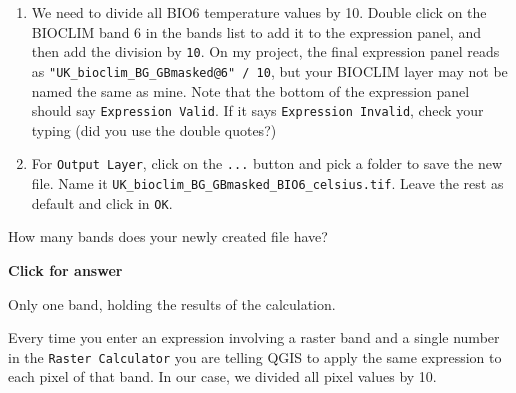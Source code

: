 \documentclass[
  letterpaper,
  DIV=11,
  numbers=noendperiod]{scrreprt}
\begin{document}
\begin{enumerate}
\def\labelenumi{(\arabic{enumi})}
\setcounter{enumi}{171}
\item
  We need to divide all BIO6 temperature values by 10. Double click on
  the BIOCLIM band 6 in the bands list to add it to the expression
  panel, and then add the division by \texttt{10}. On my project, the
  final expression panel reads as
  \texttt{"UK\_bioclim\_BG\_GBmasked@6"\ /\ 10}, but your BIOCLIM layer
  may not be named the same as mine. Note that the bottom of the
  expression panel should say \texttt{Expression\ Valid}. If it says
  \texttt{Expression\ Invalid}, check your typing (did you use the
  double quotes?)
\item
  For \texttt{Output\ Layer}, click on the \texttt{...} button and pick
  a folder to save the new file. Name it
  \texttt{UK\_bioclim\_BG\_GBmasked\_BIO6\_celsius.tif}. Leave the rest
  as default and click in \texttt{OK}.
\end{enumerate}

\begin{tcolorbox}[enhanced jigsaw, breakable, toptitle=1mm, colback=white, left=2mm, leftrule=.75mm, titlerule=0mm, colframe=quarto-callout-important-color-frame, opacityback=0, title=\textcolor{quarto-callout-important-color}{\faExclamation}\hspace{0.5em}{Stop and Think}, toprule=.15mm, opacitybacktitle=0.6, bottomtitle=1mm, colbacktitle=quarto-callout-important-color!10!white, bottomrule=.15mm, coltitle=black, rightrule=.15mm, arc=.35mm]

How many bands does your newly created file have?

\end{tcolorbox}

\begin{tcolorbox}[enhanced jigsaw, leftrule=.75mm, colframe=quarto-callout-important-color-frame, breakable, toprule=.15mm, bottomrule=.15mm, arc=.35mm, rightrule=.15mm, opacityback=0, colback=white, left=2mm]

\vspace{-3mm}\textbf{Click for answer}\vspace{3mm}

Only one band, holding the results of the calculation.

\end{tcolorbox}

Every time you enter an expression involving a raster band and a single
number in the \texttt{Raster\ Calculator} you are telling QGIS to apply
the same expression to each pixel of that band. In our case, we divided
all pixel values by 10.
\end{document}
